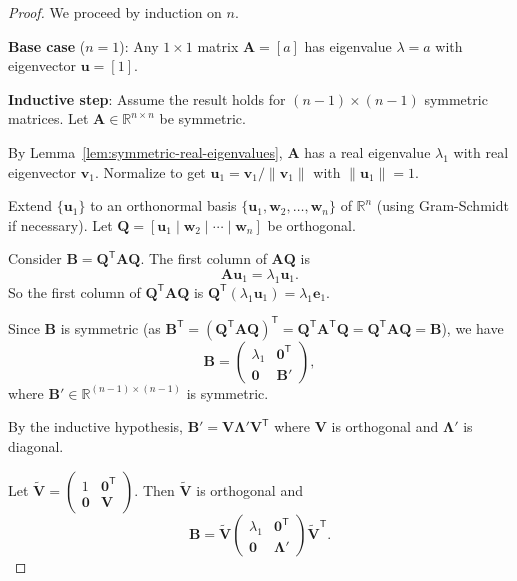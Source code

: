 \begin{proof}
  We proceed by induction on $n$.

  \textbf{Base case} ($n = 1$): Any $1 \times 1$ matrix $\mathbf{A} = [a]$ has eigenvalue $\lambda = a$ with eigenvector $\mathbf{u} = [1]$.

  \textbf{Inductive step}: Assume the result holds for $(n-1) \times (n-1)$ symmetric matrices.
  Let $\mathbf{A} \in \mathbb{R}^{n \times n}$ be symmetric.

  By Lemma~\ref{lem:symmetric-real-eigenvalues}, $\mathbf{A}$ has a real eigenvalue $\lambda_1$ with real eigenvector $\mathbf{v}_1$.
  Normalize to get $\mathbf{u}_1 = \mathbf{v}_1 / \|\mathbf{v}_1\|$ with $\|\mathbf{u}_1\| = 1$.

  Extend $\{\mathbf{u}_1\}$ to an orthonormal basis $\{\mathbf{u}_1, \mathbf{w}_2, \dots, \mathbf{w}_n\}$ of $\mathbb{R}^n$
  (using Gram-Schmidt if necessary). Let $\mathbf{Q} = [\mathbf{u}_1 \mid \mathbf{w}_2 \mid \cdots \mid \mathbf{w}_n]$ be orthogonal.

  Consider $\mathbf{B} = \mathbf{Q}^{\mathsf{T}} \mathbf{A} \mathbf{Q}$. The first column of $\mathbf{A}\mathbf{Q}$ is
  \[
    \mathbf{A}\mathbf{u}_1 = \lambda_1 \mathbf{u}_1.
  \]
  So the first column of $\mathbf{Q}^{\mathsf{T}}\mathbf{A}\mathbf{Q}$ is $\mathbf{Q}^{\mathsf{T}}(\lambda_1 \mathbf{u}_1) = \lambda_1 \mathbf{e}_1$.

  Since $\mathbf{B}$ is symmetric (as $\mathbf{B}^{\mathsf{T}} = (\mathbf{Q}^{\mathsf{T}}\mathbf{A}\mathbf{Q})^{\mathsf{T}} = \mathbf{Q}^{\mathsf{T}}\mathbf{A}^{\mathsf{T}}\mathbf{Q} = \mathbf{Q}^{\mathsf{T}}\mathbf{A}\mathbf{Q} = \mathbf{B}$),
  we have
  \[
    \mathbf{B} = \begin{pmatrix} \lambda_1 & \mathbf{0}^{\mathsf{T}} \\ \mathbf{0} & \mathbf{B}' \end{pmatrix},
  \]
  where $\mathbf{B}' \in \mathbb{R}^{(n-1) \times (n-1)}$ is symmetric.

  By the inductive hypothesis, $\mathbf{B}' = \mathbf{V}\mathbf{\Lambda}'\mathbf{V}^{\mathsf{T}}$ where $\mathbf{V}$ is orthogonal and $\mathbf{\Lambda}'$ is diagonal.

  Let $\widetilde{\mathbf{V}} = \begin{pmatrix} 1 & \mathbf{0}^{\mathsf{T}} \\ \mathbf{0} & \mathbf{V} \end{pmatrix}$. Then $\widetilde{\mathbf{V}}$ is orthogonal and
  \[
    \mathbf{B} = \widetilde{\mathbf{V}} \begin{pmatrix} \lambda_1 & \mathbf{0}^{\mathsf{T}} \\ \mathbf{0} & \mathbf{\Lambda}' \end{pmatrix} \widetilde{\mathbf{V}}^{\mathsf{T}}.
  \]


\end{proof}
